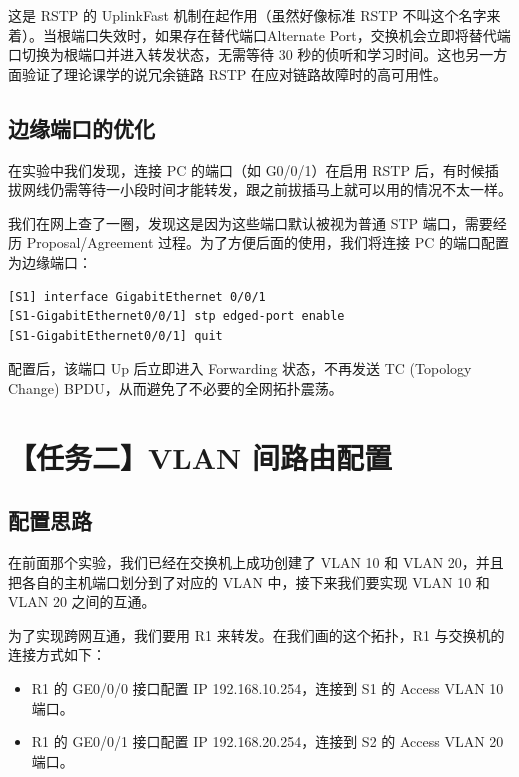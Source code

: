 \documentclass[a4paper]{article}
\begin{document}
这是 RSTP 的 UplinkFast 机制在起作用（虽然好像标准 RSTP 不叫这个名字来着）。当根端口失效时，如果存在替代端口Alternate Port，交换机会立即将替代端口切换为根端口并进入转发状态，无需等待 30 秒的侦听和学习时间。这也另一方面验证了理论课学的说冗余链路 RSTP 在应对链路故障时的高可用性。

\subsection{边缘端口的优化}

在实验中我们发现，连接 PC 的端口（如 G0/0/1）在启用 RSTP 后，有时候插拔网线仍需等待一小段时间才能转发，跟之前拔插马上就可以用的情况不太一样。

我们在网上查了一圈，发现这是因为这些端口默认被视为普通 STP 端口，需要经历 Proposal/Agreement 过程。为了方便后面的使用，我们将连接 PC 的端口配置为边缘端口：

\begin{lstlisting}[language=HuaweiConfig, caption={配置边缘端口}]
[S1] interface GigabitEthernet 0/0/1
[S1-GigabitEthernet0/0/1] stp edged-port enable
[S1-GigabitEthernet0/0/1] quit
\end{lstlisting}

配置后，该端口 Up 后立即进入 Forwarding 状态，不再发送 TC (Topology Change) BPDU，从而避免了不必要的全网拓扑震荡。

\newpage















\section{【任务二】VLAN 间路由配置}

\subsection{配置思路}

在前面那个实验，我们已经在交换机上成功创建了 VLAN 10 和 VLAN 20，并且把各自的主机端口划分到了对应的 VLAN 中，接下来我们要实现 VLAN 10 和 VLAN 20 之间的互通。

为了实现跨网互通，我们要用 R1 来转发。在我们画的这个拓扑，R1 与交换机的连接方式如下：

\begin{itemize}
    \item R1 的 GE0/0/0 接口配置 IP 192.168.10.254，连接到 S1 的 Access VLAN 10 端口。
    \item R1 的 GE0/0/1 接口配置 IP 192.168.20.254，连接到 S2 的 Access VLAN 20 端口。
\end{itemize}
\end{document}

